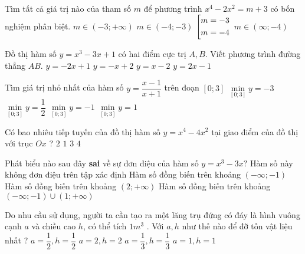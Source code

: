 \begin{ex}%
Tìm tất cả giá trị nào của tham số $m$ để phương trình $x^4-2x^2=m+3$ có bốn nghiệm phân biệt.
\choice
{$m\in(-3;+\infty)$}
{\True $m\in(-4;-3)$}
{$\left[\begin{aligned}m=-3\\m=-4\end{aligned}\right.$}
{$m\in(\infty;-4)$}
\end{ex}
\begin{ex}%
Đồ thị hàm số $y= x^3-3x+1$ có hai điểm cực trị $A, B$. Viết phương trình đường thẳng $AB.$
\choice
{\True $y=-2x+1$}
{$y=-x+2$}
{$y=x-2$}
{$y=2x-1$}
\end{ex}
\begin{ex}%
Tìm giá trị nhỏ nhất của hàm số $y=\dfrac{x-1}{x+1}$ trên đoạn $\left[0;3\right]$
\choice
{$\min\limits_{\left[0;3\right]}y=-3$}
{$\min\limits_{\left[0;3\right]}y=\dfrac{1}{2}$}
{\True $\min\limits_{\left[0;3\right]}y=-1$}
{$\min\limits_{\left[0;3\right]}y=1$}
\end{ex}
\begin{ex}%
Có bao nhiêu tiếp tuyến của đồ thị hàm số $y=x^4-4x^2$ tại giao điểm của đồ thị với trục $Ox$ ?
\choice
{$2$}
{$1$}
{\True $3$}
{$4$}
\end{ex}
\begin{ex}%
Phát biểu nào sau đây \textbf{sai} về sự đơn điệu của hàm số $y=x^3-3x?$
\choice
{Hàm số này không đơn điệu trên tập xác định}
{Hàm số đồng biến trên khoảng $(-\infty;-1)$}
{Hàm số đồng biến trên khoảng $(2;+\infty)$}
{\True Hàm số đồng biến trên khoảng $(-\infty;-1)\cup(1;+\infty)$ }
\end{ex}
\begin{ex}%
Do nhu cầu sử dụng, người ta cần tạo ra một lăng trụ đứng có đáy là hình vuông cạnh $a$
và chiều cao $h$, có thể tích $1m^3$ . Với $a, h$ như thế nào để đỡ tốn vật liệu nhất ?
\choice
{$a=\dfrac{1}{2}, h=\dfrac{1}{2}$}
{$a=2, h=2$}
{$a=\dfrac{1}{3}, h=\dfrac{1}{3}$}
{\True $a=1, h=1$}
\end{ex}
